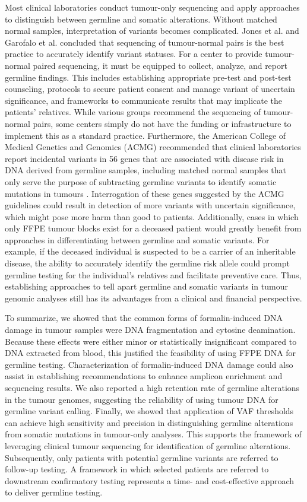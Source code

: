 Most clinical laboratories conduct tumour-only sequencing and apply approaches to distinguish between germline and somatic alterations. Without matched normal samples, interpretation of variants becomes complicated. Jones et al. \cite{Jones2015a} and Garofalo et al. \cite{Garofalo2016} concluded that sequencing of tumour-normal pairs is the best practice to accurately identify variant statuses. For a center to provide tumour-normal paired sequencing, it must be equipped to collect, analyze, and report germline findings. This includes establishing appropriate pre-test and post-test counseling, protocols to secure patient consent and manage variant of uncertain significance, and frameworks to communicate results that may implicate the patients' relatives. While various groups recommend the sequencing of tumour-normal pairs, some centers simply do not have the funding or infrastructure to implement this as a standard practice. Furthermore, the American College of Medical Genetics and Genomics (\acs{ACMG}) recommended that clinical laboratories report incidental variants in 56 genes that are associated with disease risk in DNA derived from germline samples, including matched normal samples that only serve the purpose of subtracting germline variants to identify somatic mutations in tumours \cite{Green2013}. Interrogation of these genes suggested by the ACMG guidelines could result in detection of more variants with uncertain significance, which might pose more harm than good to patients. Additionally, cases in which only FFPE tumour blocks exist for a deceased patient would greatly benefit from approaches in differentiating between germline and somatic variants. For example, if the deceased individual is suspected to be a carrier of an inheritable disease, the ability to accurately identify the germline risk allele could prompt germline testing for the individual's relatives and facilitate preventive care. Thus, establishing approaches to tell apart germline and somatic variants in tumour genomic analyses still has its advantages from a clinical and financial perspective.

To summarize, we showed that the common forms of formalin-induced DNA damage in tumour samples were DNA fragmentation and cytosine deamination. Because these effects were either minor or statistically insignificant compared to DNA extracted from blood, this justified the feasibility of using FFPE DNA for germline testing. Characterization of formalin-induced DNA damage could also assist in establishing recommendations to enhance amplicon enrichment and sequencing results. We also reported a high retention rate of germline alterations in the tumour genomes, suggesting the reliability of using tumour DNA for germline variant calling. Finally, we showed that application of VAF thresholds can achieve high sensitivity and precision in distinguishing germline alterations from somatic mutations in tumour-only analyses. This supports the framework of leveraging clinical tumour sequencing for identification of germline alterations. Subsequently, only patients with potential germline variants are referred to follow-up testing. A framework in which selected patients are referred to downstream confirmatory testing represents a time- and cost-effective approach to deliver germline testing.

